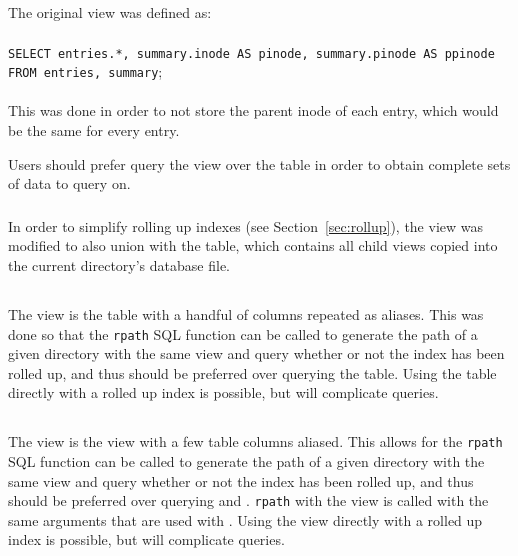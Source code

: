 \subsection{\pentries}
The original \pentries view was defined as:
\\\\
\texttt{SELECT entries.*, summary.inode AS pinode, summary.pinode AS
  ppinode FROM entries, summary};
\\\\
This was done in order to not store the parent inode of each entry,
which would be the same for every entry.

Users should prefer query the \pentries view over the \entries table
in order to obtain complete sets of data to query on.

\subsubsection{\pentriesrollup}
In order to simplify rolling up indexes (see
Section~\ref{sec:rollup}), the \pentries view was modified to also
union with the \pentriesrollup table, which contains all child
\pentries views copied into the current directory's database file.

\subsection{\vrsummary}
The \vrsummary view is the \summary table with a handful of columns
repeated as aliases. This was done so that the \texttt{rpath} SQL
function can be called to generate the path of a given directory with
the same view and query whether or not the index has been rolled up,
and thus should be preferred over querying the \summary table. Using
the \summary table directly with a rolled up index is possible, but
will complicate queries.

\subsection{\vrpentries}
The \vrpentries view is the \pentries view with a few \summary table
columns aliased. This allows for the \texttt{rpath} SQL function can
be called to generate the path of a given directory with the same view
and query whether or not the index has been rolled up, and thus should
be preferred over querying \entries and \pentries. \texttt{rpath} with
the \vrpentries view is called with the same arguments that are used
with \vrsummary. Using the \pentries view directly with a rolled up
index is possible, but will complicate queries.

